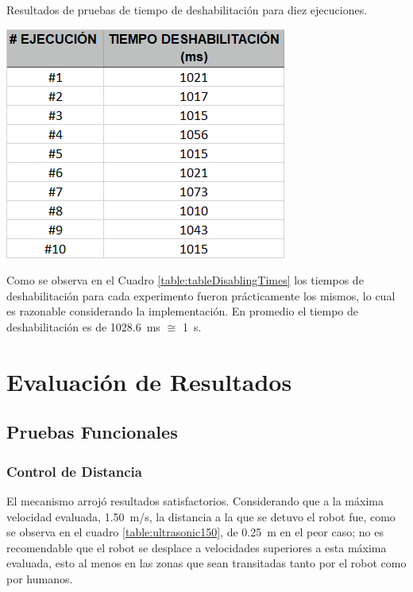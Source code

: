 \documentclass[withindex,glossary]{cam-thesis}
\begin{document}
\begin{table}[H]  
  \centering
  \begin{minipage}[b]{0.4\textwidth}  	
  	\caption[Test Tiempo Deshabilitación]{Resultados de pruebas de tiempo de deshabilitación para diez ejecuciones.}
  	\includegraphics[width=\textwidth]{images/Test_DisablingTime}
  	\label{table:tableDisablingTimes}
  \end{minipage}
\end{table}

Como se observa en el Cuadro \ref{table:tableDisablingTimes} los tiempos de deshabilitación para cada experimento fueron prácticamente los mismos, lo cual es razonable considerando la implementación. En promedio el tiempo de deshabilitación es de \SI{1028.6}{\milli\second} $\cong$ \SI{1}{\second}.


\section{Evaluación de Resultados} \label{sec:Exp Eval :: Evaluación Resultados}
\subsection{Pruebas Funcionales}
\subsubsection{Control de Distancia}
El mecanismo arrojó resultados satisfactorios. Considerando que a la máxima velocidad evaluada, \SI{1.50}{\metre/\second}, la distancia a la que se detuvo el robot fue, como se observa en el cuadro \ref{table:ultrasonic150}, de \SI{0.25}{\metre} en el peor caso; no es recomendable que el robot se desplace a velocidades superiores a esta máxima evaluada, esto al menos en las zonas que sean transitadas tanto por el robot como por humanos.
\end{document}
